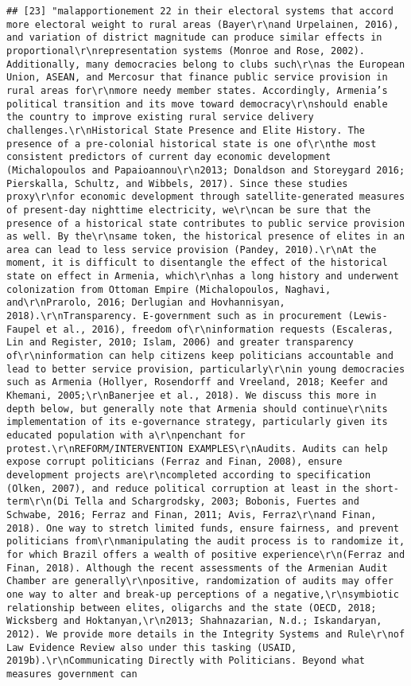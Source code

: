 \documentclass[
]{article}
\begin{document}
\begin{verbatim}
## [23] "malapportionement 22 in their electoral systems that accord more electoral weight to rural areas (Bayer\r\nand Urpelainen, 2016), and variation of district magnitude can produce similar effects in proportional\r\nrepresentation systems (Monroe and Rose, 2002). Additionally, many democracies belong to clubs such\r\nas the European Union, ASEAN, and Mercosur that finance public service provision in rural areas for\r\nmore needy member states. Accordingly, Armenia’s political transition and its move toward democracy\r\nshould enable the country to improve existing rural service delivery challenges.\r\nHistorical State Presence and Elite History. The presence of a pre-colonial historical state is one of\r\nthe most consistent predictors of current day economic development (Michalopoulos and Papaioannou\r\n2013; Donaldson and Storeygard 2016; Pierskalla, Schultz, and Wibbels, 2017). Since these studies proxy\r\nfor economic development through satellite-generated measures of present-day nighttime electricity, we\r\ncan be sure that the presence of a historical state contributes to public service provision as well. By the\r\nsame token, the historical presence of elites in an area can lead to less service provision (Pandey, 2010).\r\nAt the moment, it is difficult to disentangle the effect of the historical state on effect in Armenia, which\r\nhas a long history and underwent colonization from Ottoman Empire (Michalopoulos, Naghavi, and\r\nPrarolo, 2016; Derlugian and Hovhannisyan, 2018).\r\nTransparency. E-government such as in procurement (Lewis-Faupel et al., 2016), freedom of\r\ninformation requests (Escaleras, Lin and Register, 2010; Islam, 2006) and greater transparency of\r\ninformation can help citizens keep politicians accountable and lead to better service provision, particularly\r\nin young democracies such as Armenia (Hollyer, Rosendorff and Vreeland, 2018; Keefer and Khemani, 2005;\r\nBanerjee et al., 2018). We discuss this more in depth below, but generally note that Armenia should continue\r\nits implementation of its e-governance strategy, particularly given its educated population with a\r\npenchant for protest.\r\nREFORM/INTERVENTION EXAMPLES\r\nAudits. Audits can help expose corrupt politicians (Ferraz and Finan, 2008), ensure development projects are\r\ncompleted according to specification (Olken, 2007), and reduce political corruption at least in the short-term\r\n(Di Tella and Schargrodsky, 2003; Bobonis, Fuertes and Schwabe, 2016; Ferraz and Finan, 2011; Avis, Ferraz\r\nand Finan, 2018). One way to stretch limited funds, ensure fairness, and prevent politicians from\r\nmanipulating the audit process is to randomize it, for which Brazil offers a wealth of positive experience\r\n(Ferraz and Finan, 2018). Although the recent assessments of the Armenian Audit Chamber are generally\r\npositive, randomization of audits may offer one way to alter and break-up perceptions of a negative,\r\nsymbiotic relationship between elites, oligarchs and the state (OECD, 2018; Wicksberg and Hoktanyan,\r\n2013; Shahnazarian, N.d.; Iskandaryan, 2012). We provide more details in the Integrity Systems and Rule\r\nof Law Evidence Review also under this tasking (USAID, 2019b).\r\nCommunicating Directly with Politicians. Beyond what measures government can 
\end{verbatim}
\end{document}
